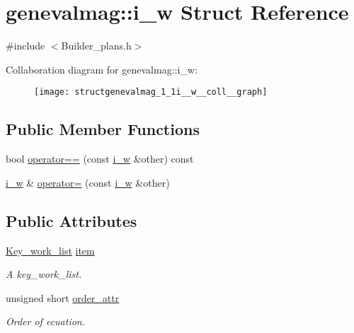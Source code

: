 \hypertarget{structgenevalmag_1_1i__w}{
\section{genevalmag::i\_\-w Struct Reference}
\label{structgenevalmag_1_1i__w}
}


{\ttfamily \#include $<$Builder\_\-plans.h$>$}



Collaboration diagram for genevalmag::i\_\-w:\nopagebreak
\begin{figure}[H]
\begin{center}
\leavevmode
\texttt{[image: structgenevalmag\_1\_1i\_\_w\_\_coll\_\_graph]}
\end{center}
\end{figure}
\subsection*{Public Member Functions}
\begin{DoxyCompactItemize}
\item 
bool \hyperlink{structgenevalmag_1_1i__w_ac382c0ff3ab5b4ae50512a64ec16ae5d}{operator==} (const \hyperlink{structgenevalmag_1_1i__w}{i\_\-w} \&other) const 
\item 
\hyperlink{structgenevalmag_1_1i__w}{i\_\-w} \& \hyperlink{structgenevalmag_1_1i__w_ab769b7c451b0e1c4d2cb36eba15f99ab}{operator=} (const \hyperlink{structgenevalmag_1_1i__w}{i\_\-w} \&other)
\end{DoxyCompactItemize}
\subsection*{Public Attributes}
\begin{DoxyCompactItemize}
\item 
\hyperlink{structgenevalmag_1_1k__w}{Key\_\-work\_\-list} \hyperlink{structgenevalmag_1_1i__w_acb047851d2d48bfa097543a5a891e995}{item}
\begin{DoxyCompactList}\small\item\em A key\_\-work\_\-list. \item\end{DoxyCompactList}\item 
unsigned short \hyperlink{structgenevalmag_1_1i__w_aa3b6c0dee2aa7ce5808ff3d7068e20e9}{order\_\-attr}
\begin{DoxyCompactList}\small\item\em Order of ecuation. \item\end{DoxyCompactList}\end{DoxyCompactItemize}


